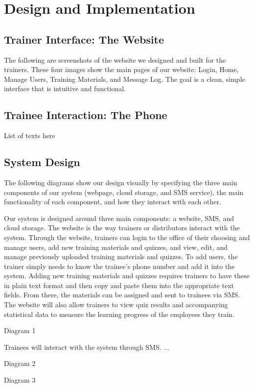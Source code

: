 \chapter{Design and Implementation}

\section{Trainer Interface: The Website}
The following are screenshots of the website we designed and built for the trainers. These four images show the main pages of our website: Login, Home, Manage Users, Training Materials, and Message Log. The goal is a clean, simple interface that is intuitive and functional.

\section{Trainee Interaction: The Phone}
List of texts here

\section{System Design}
The following diagrams show our design visually by specifying the three main components of our system (webpage, cloud storage, and SMS service), the main functionality of each component, and how they interact with each other.

Our system is designed around three main components: a website, SMS, and cloud storage. The website is the way trainers or distributors interact with the system. Through the website, trainers can login to the office of their choosing and manage users, add new training materials and quizzes, and view, edit, and manage previously uploaded training materials and quizzes. To add users, the trainer simply needs to know the trainee's phone number and add it into the system. Adding new training materials and quizzes requires trainers to have these in plain text format and then copy and paste them into the appropriate text fields. From there, the materials can be assigned and sent to trainees via SMS. The website will also allow trainers to view quiz results and accompanying statistical data to measure the learning progress of the employees they train. 

Diagram 1

Trainees will interact with the system through SMS. ...

Diagram 2

Diagram 3

